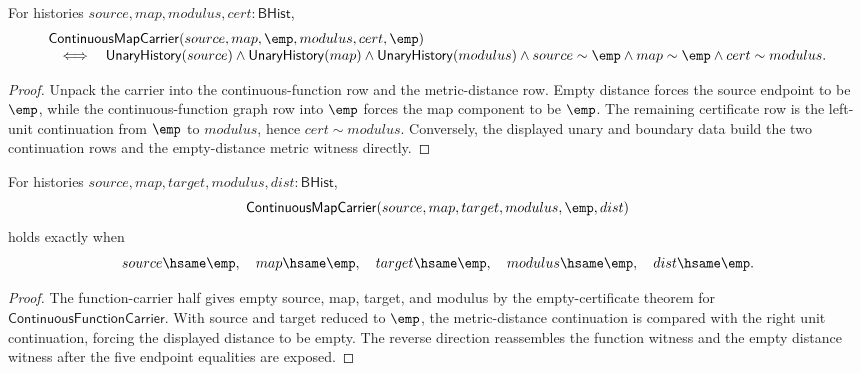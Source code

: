 \begin{theorem}
\label{thm:continuousmap-carrier-empty-distance-exact}
For histories $source,map,modulus,cert:\mathsf{BHist}$,
$$
\begin{array}{l}
\mathsf{ContinuousMapCarrier}(source,map,\emp,modulus,cert,\emp)\\
\quad\Longleftrightarrow\quad
\mathsf{UnaryHistory}(source)\land
\mathsf{UnaryHistory}(map)\land
\mathsf{UnaryHistory}(modulus)\land
source\sim\emp\land map\sim\emp\land cert\sim modulus.
\end{array}
$$
\end{theorem}
\begin{proof}
Unpack the carrier into the continuous-function row and the metric-distance
row. Empty distance forces the source endpoint to be $\emp$, while the
continuous-function graph row into $\emp$ forces the map component to be
$\emp$. The remaining certificate row is the left-unit continuation from
$\emp$ to $modulus$, hence $cert\sim modulus$. Conversely, the displayed
unary and boundary data build the two continuation rows and the empty-distance
metric witness directly.
\end{proof}

\begin{theorem}
\label{thm:continuousmap-carrier-empty-cert-exactness}
For histories $source,map,target,modulus,dist:\mathsf{BHist}$,
$$
\mathsf{ContinuousMapCarrier}(source,map,target,modulus,\emp,dist)
$$
holds exactly when
$$
source \hsame \emp,\quad map \hsame \emp,\quad target \hsame \emp,\quad
modulus \hsame \emp,\quad dist \hsame \emp .
$$
\end{theorem}
\begin{proof}
The function-carrier half gives empty source, map, target, and modulus by the
empty-certificate theorem for $\mathsf{ContinuousFunctionCarrier}$. With source
and target reduced to $\emp$, the metric-distance continuation is compared with
the right unit continuation, forcing the displayed distance to be empty. The
reverse direction reassembles the function witness and the empty distance
witness after the five endpoint equalities are exposed.
\end{proof}

